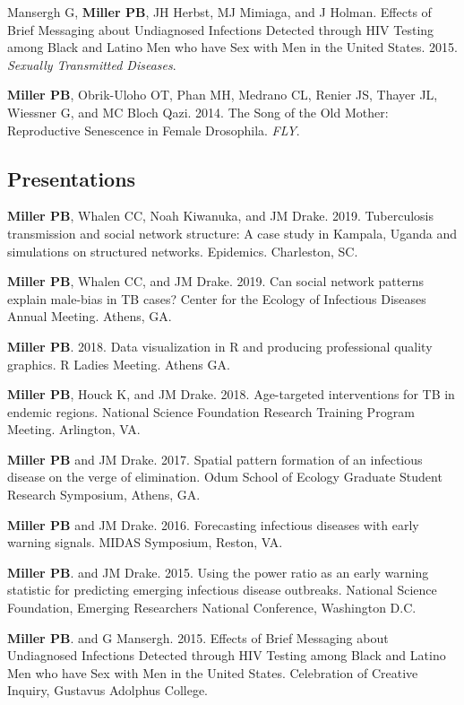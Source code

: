 \documentclass[letterpaper]{article}
\renewenvironment{itemize}{
  \begin{list}{}{
    \setlength{\leftmargin}{1.5em}
  }
}{
  \end{list}
}
\begin{document}
\begin{itemize}
\item Mansergh G, \textbf{Miller PB}, JH Herbst, MJ Mimiaga, and J Holman. Effects of Brief Messaging about Undiagnosed Infections Detected through HIV Testing among Black and Latino Men who have Sex with Men in the United States. 2015. \textit{Sexually Transmitted Diseases}.
\item \textbf{Miller PB}, Obrik-Uloho OT, Phan MH, Medrano CL, Renier JS, Thayer JL, Wiessner G, and MC Bloch Qazi. 2014. The Song of the Old Mother: Reproductive Senescence in Female Drosophila. \textit{FLY}.
\end{itemize}

\subsection*{Presentations}
\begin{itemize}
\item  \textbf{Miller PB}, Whalen CC, Noah Kiwanuka, and JM Drake. 2019. Tuberculosis transmission and social network structure: A case study in Kampala, Uganda and simulations on structured networks. Epidemics. Charleston, SC. 
\item  \textbf{Miller PB}, Whalen CC, and JM Drake. 2019. Can social network patterns explain male-bias in TB cases? Center for the Ecology of Infectious Diseases Annual Meeting. Athens, GA.
\item \textbf{Miller PB}. 2018. Data visualization in R and producing professional quality graphics. R Ladies Meeting. Athens GA. 
\item   \textbf{Miller PB}, Houck K, and JM Drake. 2018. Age-targeted interventions for TB in endemic regions. National Science Foundation Research Training Program Meeting. Arlington, VA. 
\item  \textbf{Miller PB} and JM Drake. 2017. Spatial pattern formation of an infectious disease on the verge of elimination. Odum School of Ecology Graduate Student Research Symposium, Athens, GA. 
\item \textbf{Miller PB} and JM Drake. 2016. Forecasting infectious diseases with early warning signals. MIDAS Symposium, Reston, VA. 
\item \textbf{Miller PB}. and JM Drake. 2015. Using the power ratio as an early warning statistic for predicting emerging infectious disease outbreaks. National Science Foundation, Emerging Researchers National Conference, Washington D.C.
\item \textbf{Miller PB}. and G Mansergh. 2015. Effects of Brief Messaging about Undiagnosed Infections Detected through HIV Testing among Black and Latino Men who have Sex with Men in the United States. Celebration of Creative Inquiry, Gustavus Adolphus College.
\end{itemize}
\end{document}
